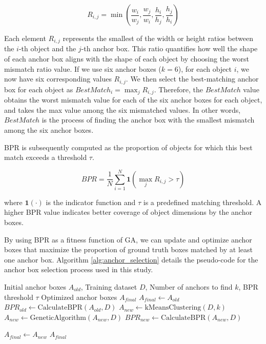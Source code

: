 \documentclass[journal,twoside,web]{ieeecolor}
\begin{document}
\begin{equation}
R_{i,j} = \min\left(\frac{w_i}{w_j}, \frac{w_j}{w_i}, \frac{h_i}{h_j}, \frac{h_j}{h_i}\right)
\label{eq:bpr_ratio}
\end{equation}

Each element $R_{i,j}$ represents the smallest of the width or height ratios between the $i$-th object and the $j$-th anchor box. This ratio quantifies how well the shape of each anchor box aligns with the shape of each object by choosing the worst mismatch ratio value. If we use six anchor boxes ($k=6$), for each object $i$, we now have six corresponding values $R_{i,j}$. We then select the best-matching anchor box for each object as $BestMatch_i = \max_j R_{i,j}$. Therefore, the $BestMatch$ value obtains the worst mismatch value for each of the six anchor boxes for each object, and takes the max value among the six mismatched values. In other words, $BestMatch$ is the process of finding the anchor box with the smallest mismatch among the six anchor boxes.

\ac{BPR} is subsequently computed as the proportion of objects for which this best match exceeds a threshold $\tau$.

\begin{equation}
BPR = \frac{1}{N} \sum_{i=1}^{N} \mathbf{1}(\max_j R_{i,j} > \tau)
\label{eq:bpr_calc}
\end{equation}

\noindent where $\mathbf{1}(\cdot)$ is the indicator function and $\tau$ is a predefined matching threshold. A higher \ac{BPR} value indicates better coverage of object dimensions by the anchor boxes.

By using \ac{BPR} as a fitness function of \ac{GA}, we can update and optimize anchor boxes that maximize the proportion of ground truth boxes matched by at least one anchor box. Algorithm \ref{alg:anchor_selection} details the pseudo-code for the anchor box selection process used in 
this study.

\begin{algorithm}[b]
\caption{Anchor Box Selection Algorithm}
\label{alg:anchor_selection}
\begin{algorithmic}[1]
\Require Initial anchor boxes $A_{old}$, Training dataset $D$, Number of anchors to find $k$, BPR threshold $\tau$
\Ensure Optimized anchor boxes $A_{final}$
\State $A_{final} \gets A_{old}$ 
\State $BPR_{old} \gets \text{CalculateBPR}(A_{old}, D)$
    \State $A_{new} \gets \text{kMeansClustering}(D, k)$
    \State $A_{new} \gets \text{GeneticAlgorithm}(A_{new}, D)$
    \State $BPR_{new} \gets \text{CalculateBPR}(A_{new}, D)$
    
        \State $A_{final} \gets A_{new}$ 
    \EndIf %
\EndIf     %
\State \Return $A_{final}$
\end{algorithmic}
\end{algorithm}
\end{document}
